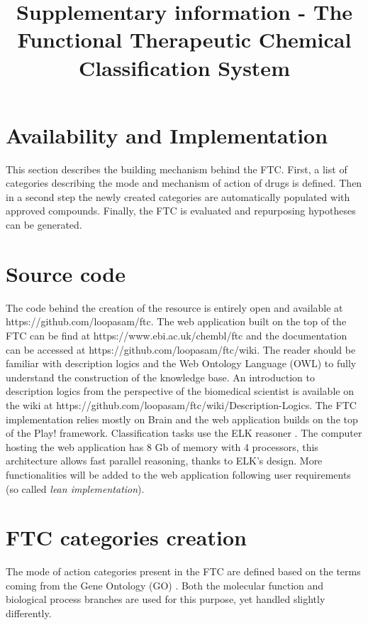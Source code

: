 \documentclass{bioinfo}
\begin{document}

\title[Supplementary information - The Functional Therapeutic Chemical Classification System]{Supplementary information - 
The Functional Therapeutic Chemical Classification System}

\section*{Availability and Implementation}

This section describes the building mechanism behind the FTC. 
First, a list of categories describing the mode and mechanism of action of drugs is defined. 
Then in a second step the newly created categories are automatically populated with approved compounds. 
Finally, the FTC is evaluated and repurposing hypotheses can be generated.

\section{Source code}
The code behind the creation of the resource is entirely open and available 
at {{https://github.com/loopasam/ftc}}. The web application built on the top of the 
FTC can be find at {{https://www.ebi.ac.uk/chembl/ftc}} and the documentation can be 
accessed at {{https://github.com/loopasam/ftc/wiki}}. The reader should be familiar with 
description logics and the Web Ontology Language (OWL) to fully understand the construction of the 
knowledge base. An introduction to description logics from the perspective of the biomedical scientist is 
available on the wiki at {{https://github.com/loopasam/ftc/wiki/Description-Logics}}. The FTC implementation 
relies mostly on Brain \citep{Croset2013} and the web application builds on the top of the Play! framework. 
Classification tasks use the ELK reasoner \citep{Kazakov2011}. The computer hosting the web application has 8 Gb of memory 
with 4 processors, this architecture allows fast parallel reasoning, thanks to ELK's design. More functionalities 
will be added to the web application following user requirements (so called \emph{lean implementation}).

\section{FTC categories creation}
The mode of action categories present in the FTC are defined based on the terms coming from the 
Gene Ontology (GO) \citep{Ashburner2000}. Both the molecular function and biological process branches are used for 
this purpose, yet handled slightly differently.
\end{document}
